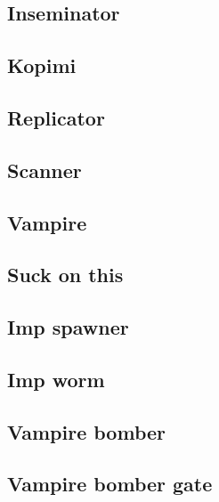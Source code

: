 \documentclass[11pt]{article}
\begin{document}
\subsection{Inseminator}


\subsection{Kopimi}


\subsection{Replicator}



\subsection{Scanner}


\subsection{Vampire}


\subsection{Suck on this}



\newpage
\subsection{Imp spawner}


\subsection{Imp worm}


\subsection{Vampire bomber}


\newpage
\subsection{Vampire bomber gate}

\end{document}

